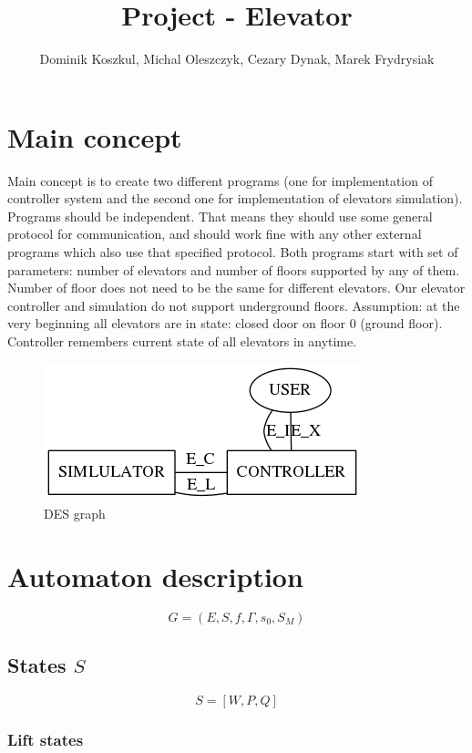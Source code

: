\documentclass[12pt]{article}
\title{Project - Elevator}
\author{Dominik Koszkul, Michal Oleszczyk, Cezary Dynak, Marek Frydrysiak }
\begin{document}
\maketitle{}


\section{Main concept}
	Main concept is to create two different programs (one for implementation of controller system and the second one for implementation of elevators simulation). Programs should be independent. That means they should use some general protocol for communication, and should work fine with any other external programs which also use that specified protocol. Both programs start with set of parameters: number of elevators and number of floors supported by any of them. Number of floor does not need to be the same for different elevators. Our elevator controller and simulation do not support underground floors.
\newline
\newline
Assumption: at the very beginning all elevators are in state: closed door on floor 0 (ground floor). Controller remembers current state of all elevators in anytime.

\begin{figure}
  \centering
  \includegraphics{img/simulator_controller.png}
  \caption{DES graph}
\end{figure}

\section{Automaton description}

\[ G = (E, S, f, \Gamma, s_0, S_M) \]

\subsection{States \(S\)}

\[ S = [W, P, Q] \]

\subsubsection{Lift states}
\end{document}
